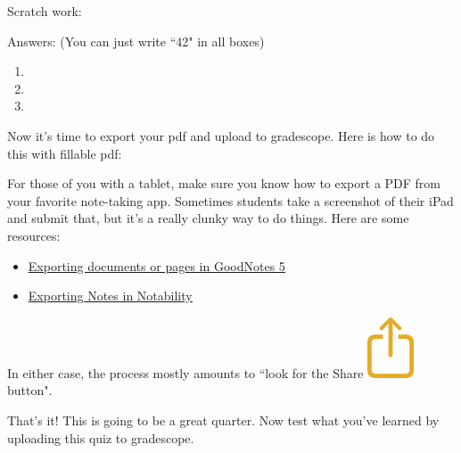 \documentclass[12pt]{article}
\begin{document}
\begin{enumerate}
\pagebreak

  \setcounter{problemnumber}{1}
\Problem Scratch work:

\vfill

Answers: (You can just write ``42" in all boxes)
\begin{enumerate}[label=(\roman*)]
\item {}
\item {}
\item {}
\end{enumerate}

\bigskip

\Problem Now it's time to export your pdf and upload to gradescope. Here is how to do this with  fillable pdf:

\bigskip



For those of you with a tablet, make sure you know how to export a PDF from your favorite note-taking app. Sometimes students take a screenshot of their iPad and submit that, but it's a really clunky way to do things. Here are some resources: 
\begin{itemize}
\item\href{https://support.goodnotes.com/hc/en-us/articles/360000630495-Exporting-documents-or-pages-in-GoodNotes-5}{\underline{Exporting documents or pages in GoodNotes 5}} 
\item \href{https://support.gingerlabs.com/hc/en-us/articles/205228298-Exporting-Notes}{\underline{Exporting Notes in Notability}}
\end{itemize}
 In either case, the process mostly amounts to ``look for the Share \includegraphics[scale=.15]{ios14-notes-share-icon} button". 

\bigskip
That's it! This is going to be a great quarter. Now test what you've learned by uploading this quiz to gradescope. 


\end{enumerate}
\end{document}
